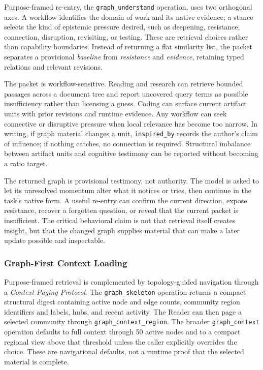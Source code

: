 Purpose-framed re-entry, the \texttt{graph\_understand} operation, uses two orthogonal axes. A workflow identifies the domain of work and its native evidence; a stance selects the kind of epistemic pressure desired, such as deepening, resistance, connection, disruption, revisiting, or testing. These are retrieval choices rather than capability boundaries. Instead of returning a flat similarity list, the packet separates a provisional \emph{baseline} from \emph{resistance} and \emph{evidence}, retaining typed relations and relevant revisions.

The packet is workflow-sensitive. Reading and research can retrieve bounded passages across a document tree and report uncovered query terms as possible insufficiency rather than licensing a guess. Coding can surface current artifact units with prior revisions and runtime evidence. Any workflow can seek connective or disruptive pressure when local relevance has become too narrow. In writing, if graph material changes a unit, \texttt{inspired\_by} records the author's claim of influence; if nothing catches, no connection is required. Structural imbalance between artifact units and cognitive testimony can be reported without becoming a ratio target.

The returned graph is provisional testimony, not authority. The model is asked to let its unresolved momentum alter what it notices or tries, then continue in the task's native form. A useful re-entry can confirm the current direction, expose resistance, recover a forgotten question, or reveal that the current packet is insufficient. The critical behavioral claim is not that retrieval itself creates insight, but that the changed graph supplies material that can make a later update possible and inspectable.

\subsubsection{Graph-First Context Loading}
\label{sec:graph-first-context}

Purpose-framed retrieval is complemented by topology-guided navigation through a \emph{Context Paging Protocol}. The \texttt{graph\_skeleton} operation returns a compact structural digest containing active node and edge counts, community region identifiers and labels, hubs, and recent activity. The Reader can then page a selected community through \texttt{graph\_context\_region}. The broader \texttt{graph\_context} operation defaults to full context through 50 active nodes and to a compact regional view above that threshold unless the caller explicitly overrides the choice. These are navigational defaults, not a runtime proof that the selected material is complete.

